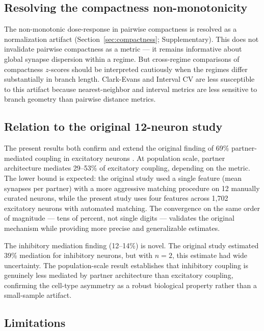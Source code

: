 \documentclass[11pt]{article}
\begin{document}
\subsection{Resolving the compactness non-monotonicity}

The non-monotonic dose-response in pairwise compactness is resolved as a normalization artifact (Section~\ref{sec:compactness}; Supplementary). This does not invalidate pairwise compactness as a metric --- it remains informative about global synapse dispersion within a regime. But cross-regime comparisons of compactness $z$-scores should be interpreted cautiously when the regimes differ substantially in branch length. Clark-Evans and Interval CV are less susceptible to this artifact because nearest-neighbor and interval metrics are less sensitive to branch geometry than pairwise distance metrics.


\subsection{Relation to the original 12-neuron study}

The present results both confirm and extend the original finding of 69\% partner-mediated coupling in excitatory neurons \citep{voruganti2026coupling}. At population scale, partner architecture mediates 29--53\% of excitatory coupling, depending on the metric. The lower bound is expected: the original study used a single feature (mean synapses per partner) with a more aggressive matching procedure on 12 manually curated neurons, while the present study uses four features across 1,702 excitatory neurons with automated matching. The convergence on the same order of magnitude --- tens of percent, not single digits --- validates the original mechanism while providing more precise and generalizable estimates.

The inhibitory mediation finding (12--14\%) is novel. The original study estimated 39\% mediation for inhibitory neurons, but with $n = 2$, this estimate had wide uncertainty. The population-scale result establishes that inhibitory coupling is genuinely less mediated by partner architecture than excitatory coupling, confirming the cell-type asymmetry as a robust biological property rather than a small-sample artifact.


\subsection{Limitations}
\label{sec:limitations}
\end{document}
